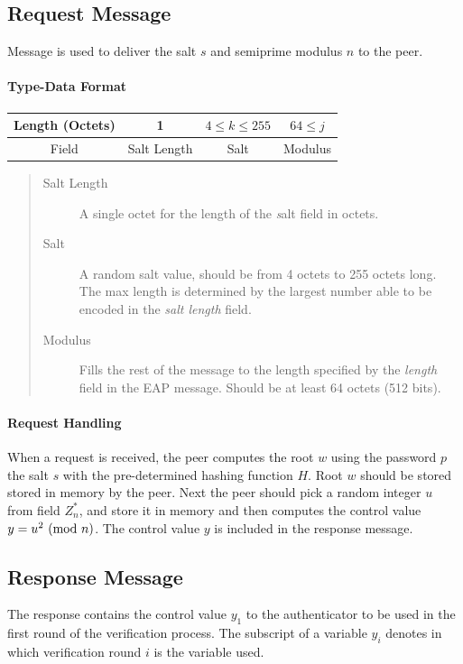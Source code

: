 \subsection*{Request Message} Message is used to deliver the salt $s$ and semiprime modulus $n$ to the peer.

\paragraph{Type-Data Format}

\begin{center}
\begin{tabular}{|c|c|c|c|}
	\hline
	Length (Octets) & 1 & $4 \le k \le 255 $ & $64 \le j$\\
	\hline
	Field & Salt Length & Salt & Modulus\\
	\hline
\end{tabular}
\end{center}

\begin{quote}
\begin{description}
	\item[Salt Length] A single octet for the length of the \textit salt field in octets.
	\item[Salt] A random salt value, should be from 4 octets to 255 octets long.
The max length is determined by the largest number able to be encoded in the \textit {salt length} field.
	\item[Modulus] Fills the rest of the message to the length specified by the \textit{length} field in the EAP message. 
Should be at least 64 octets (512 bits).
\end{description}
\end{quote}

\paragraph{Request Handling} When a request is received, the peer computes the root $w$ using the password $p$ the salt $s$ with the pre-determined hashing function $H$.
Root $w$ should be stored stored in memory by the peer. 
Next the peer should pick a random integer $u$ from field $Z^*_n$, and store it in memory and then computes the control value $y = u^2 \ (\mathrm{mod}\ n)$.
The control value $y$ is included in the response message.

\subsection*{Response Message}
The response contains the control value $y_1$ to the authenticator to be used in the first round of the verification process.
The subscript of a variable $y_i$ denotes in which verification round $i$ is the variable used.

